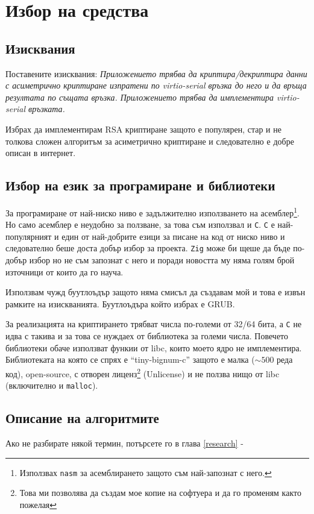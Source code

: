 \section{Избор на средства}
\subsection{Изисквания}
Поставените изисквания: \textit{Приложението трябва да криптира/декриптира данни с асиметрично криптиране изпратени по virtio-serial връзка до него и да връща резултата по същата връзка. Приложението трябва да имплементира virtio-serial връзката.}

Избрах да имплементирам RSA криптиране защото е популярен, стар и не толкова сложен алгоритъм за асиметрично криптиране и следователно е добре описан в интернет.

\subsection{Избор на език за програмиране и библиотеки} \label{langchoice}
За програмиране от най-ниско ниво е задължително използването на асемблер\footnote{Използвах {\tt nasm} за асемблирането защото съм най-запознат с него.}. Но само асемблер е неудобно за ползване, за това съм използвал и {\tt C}. {\tt C} е най-популярният и един от най-добрите езици за писане на код от ниско ниво и следователно беше доста добър избор за проекта. {\tt Zig} може би щеше да бъде по-добър избор но не съм запознат с него и поради новостта му няма голям брой източници от които да го науча.

Използвам чужд буутлоъдър защото няма смисъл да създавам мой и това е извън рамките на изискванията. Буутлоъдъра който избрах е GRUB.

За реализацията на криптирането трябват числа по-големи от 32/64 бита, а {\tt C} не идва с такива и за това се нуждаех от библиотека за големи числа. Повечето библиотеки обаче използват функии от libc, които моето ядро не имплементира. Библиотеката на която се спрях е ``tiny-bignum-c''\parencite{tinybignumc} защото е малка ($\sim500$ реда код), open-source, с отворен лиценз\footnote{Това ми позволява да създам мое копие на софтуера и да го променям както пожелая} (Unlicense) и не ползва нищо от libc (включително и {\tt malloc}).

\subsection{Описание на алгоритмите}
Ако не разбирате някой термин, потърсете го в глава \ref{research} - 

